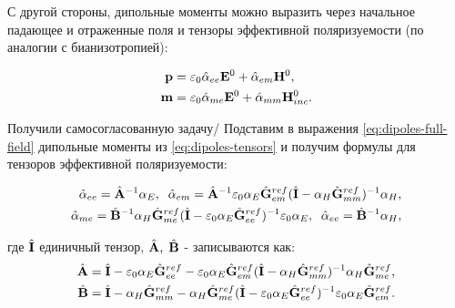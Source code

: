 С другой стороны, дипольные моменты можно выразить через начальное падающее и отраженные поля и тензоры эффективной поляризуемости (по аналогии с бианизотропией):

\begin{equation}
    \begin{aligned}
        \vb{p} &= \varepsilon_0 \hat{\alpha}_{ee} \vb{E}^0 + \hat{\alpha}_{em} \vb{H}^0,  \\
        \vb{m} &=   \varepsilon_0 \hat{\alpha}_{me} \vb{E}^0+ \hat{\alpha}_{mm} \vb{H}^0_{inc}. \label{eq:dipoles-tensors} 
    \end{aligned}
\end{equation}

Получили самосогласованную задачу/ Подставим в выражения \eqref{eq:dipoles-full-field} дипольные моменты из \eqref{eq:dipoles-tensors} и получим формулы для тензоров эффективной поляризуемости:

\begin{equation}
    \begin{aligned}
        \hat{\alpha}_{ee} = \hat{\vb{A}}^{-1} \alpha_E, \;\;
        \hat{\alpha}_{em} = \hat{\vb{A}}^{-1} \varepsilon_0 \alpha_E \hat{\vb{G}}_{em}^{ref} ( \hat{\vb{I}} - \alpha_H \hat{\vb{G}}_{mm}^{ref})^{-1} \alpha_H,\\
        \hat{\alpha}_{me} = \hat{\vb{B}}^{-1} \alpha_H \hat{\vb{G}}^{ref}_{me} (\hat{\vb{I}} - \varepsilon_0 \alpha_E \hat{\vb{G}}_{ee}^{ref} )^{-1} \varepsilon_0 \alpha_E, \;\;
        \hat{\alpha}_{ee} = \hat{\vb{B}}^{-1} \alpha_H,
    \end{aligned}\label{eq:polaris-tensors}
\end{equation}

где $\hat{\vb{I}}$ единичный тензор, $\hat{\vb{A}},\; \hat{\vb{B}}$ - записываются как:
\begin{equation}
    \begin{aligned}
        \hat{\vb{A}} &= \hat{\vb{I}} - \varepsilon_0 \alpha_E \hat{\vb{G}}_{ee}^{ref} - \varepsilon_0 \alpha_E \hat{\vb{G}}_{em}^{ref} ( \hat{\vb{I}} - \alpha_H \hat{\vb{G}}_{mm}^{ref})^{-1} \alpha_H \hat{\vb{G}}_{me}^{ref},\\
        \hat{\vb{B}} &= \hat{\vb{I}} - \alpha_H \hat{\vb{G}}_{mm}^{ref} - \alpha_H \hat{\vb{G}}^{ref}_{me} (\hat{\vb{I}} - \varepsilon_0 \alpha_E \hat{\vb{G}}_{ee}^{ref} )^{-1} \varepsilon_0 \alpha_E \hat{\vb{G}}_{em}^{ref}.
    \end{aligned}
\end{equation}




